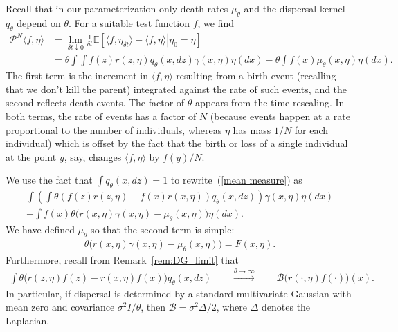 \documentclass[EJP]{ejpecp} %
\newcommand{\IE}{\mathbb E}
\newcommand{\DG}{\mathcal{B}}  %
\newcommand{\Pgen}{\mathcal{P}}    %
\begin{document}
Recall that in our parameterization only death rates $\mu_\theta$
and the dispersal kernel $q_\theta$ depend on $\theta$.
For a suitable test function $f$, we find
\begin{equation} \label{mean measure}
    \begin{split}
    \Pgen^N \langle f, \eta \rangle
    &=
    \lim_{\delta t\downarrow 0} \frac{1}{\delta t}
    \IE\left[ \left.
        \langle f, \eta_{\delta t} \rangle
        -
        \langle f, \eta\rangle
        \right| \eta_0 = \eta
    \right]
    \\
    &=
    \theta \int
        \int f(z) r(z,\eta) q_\theta(x,dz)
    \gamma(x, \eta) \eta(dx)
    -
    \theta \int f(x)\mu_\theta(x, \eta)
    \eta(dx).
    \end{split}
\end{equation}
The first term is the increment in $\langle f,\eta\rangle$
resulting from a birth event (recalling that
we don't kill the parent) integrated against the rate of such events,
and the second reflects death events.
The factor of $\theta$ appears from the time rescaling.
In both terms,
the rate of events has a factor of $N$ (because events happen at a rate 
proportional to the number of individuals,
whereas $\eta$ has mass $1/N$ for each individual)
which is offset by the fact that  
the birth or loss of a single 
individual at the point $y$, say, changes $\langle f,\eta\rangle$
by $f(y)/N$.

We use the fact that $\int q_\theta(x,dz)=1$ to rewrite~(\ref{mean measure})
as 
\begin{equation}
\label{eqn:rewritten mean measure}
\begin{split}
    \int\left(
        \int \theta \left( f(z) r(z,\eta)- f(x) r(x,\eta) \right) q_\theta(x,dz)
    \right)
    \gamma(x,\eta)
    \eta(dx)
    \\
    + \int f(x) \theta \Big(
        r(x,\eta) \gamma(x,\eta)
        - \mu_\theta(x,\eta)
    \Big) \eta(dx).
\end{split}
\end{equation}
We have defined $\mu_\theta$ so that the second term is simple:
\begin{align*}
    \theta \Big( r(x,\eta) \gamma(x,\eta) - \mu_\theta(x,\eta) \Big)
    = F(x, \eta) .
\end{align*}
Furthermore, recall from Remark~\ref{rem:DG_limit} that
\begin{align} \label{eqn:near_critical}
    \int \theta \Big(
        r(z,\eta) f(z)
        -
        r(x,\eta) f(x)
    \Big) q_\theta(x,dz) 
    \qquad \stackrel{\theta\to\infty}{\longrightarrow} \qquad  
    \DG \big(r(\cdot,\eta)f(\cdot)\big)(x) .
\end{align}
In particular,
if dispersal is determined by a standard multivariate Gaussian
with mean zero and covariance $\sigma^2 I / \theta$,
then $\DG = \sigma^2 \Delta / 2$, where $\Delta$ denotes the Laplacian.
\end{document}
